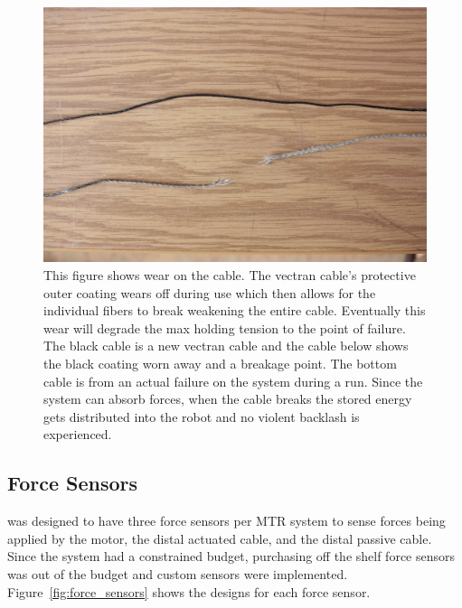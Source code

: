 \begin{appendices}
\begin{figure}[thpb]
      \centering
      \includegraphics[width=0.8\columnwidth]{tex/img/broken_cable}
      \caption{This figure shows wear on the cable. The vectran cable's protective outer coating wears off during use which then allows for the individual fibers to break weakening the entire cable. Eventually this wear will degrade the max holding tension to the point of failure. The black cable is a new vectran cable and the cable below shows the black coating worn away and a breakage point. The bottom cable is from an actual failure on the system during a run. Since the system can absorb forces, when the cable breaks the stored energy gets distributed into the robot and no violent backlash is experienced.}
      \label{fig:cable_break}
\end{figure}

\subsection{Force Sensors}
\label{force_sensing_failure}
\SB{} was designed to have three force sensors per MTR system to sense forces being applied by the motor, the distal actuated cable, and the distal passive cable.
Since the system had a constrained budget, purchasing off the shelf force sensors was out of the budget and custom sensors were implemented.
Figure~\ref{fig:force_sensors} shows the designs for each force sensor.


\end{appendices}
